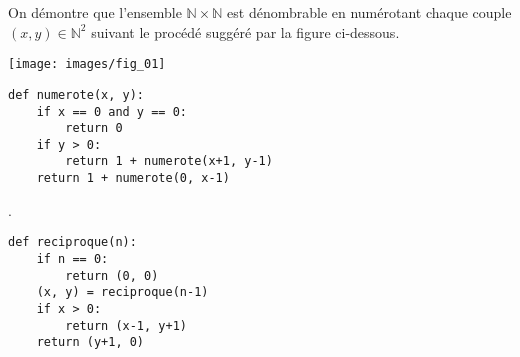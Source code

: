 \setcounter{numques}{0}




On démontre que l'ensemble $\mathbb{N}\times \mathbb{N}$ est dénombrable en numérotant chaque couple $(x,y)\in\mathbb{N}^2$ suivant le procédé suggéré par la figure ci-dessous.

\begin{center}
\texttt{[image: images/fig\_01]}
\end{center}

\ifprof
\begin{lstlisting}
def numerote(x, y):
    if x == 0 and y == 0:
        return 0
    if y > 0:
        return 1 + numerote(x+1, y-1)
    return 1 + numerote(0, x-1)
\end{lstlisting}
\else

\fi

.
\ifprof
\begin{lstlisting}
def reciproque(n):
    if n == 0:
        return (0, 0)
    (x, y) = reciproque(n-1)
    if x > 0:
        return (x-1, y+1)
    return (y+1, 0)
\end{lstlisting}
\else

\fi
